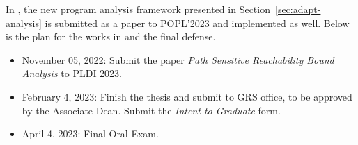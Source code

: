 In , the new program analysis framework presented in Section~\ref{sec:adapt-analysis}
 is submitted as a paper to POPL'2023 and implemented as well. 
 Below is the plan for
 the works in  and the final defense.

\begin{itemize}
    \item November 05, 2022: Submit the paper \emph{Path Sensitive Reachability Bound Analysis} to PLDI 2023.
    \item February 4, 2023: Finish the thesis and submit to GRS office, to be approved by the Associate Dean. Submit the \emph{Intent to Graduate} form.
    \item April 4, 2023: Final Oral Exam. 
\end{itemize}